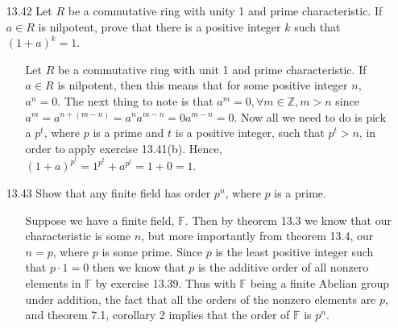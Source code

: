 \documentclass[12pt]{article}
\begin{document}
\begin{enumerate}
\item[13.42] Let $R$ be a commutative ring with unity 1 and prime characteristic. If $a \in R$ is nilpotent,
prove that there is a positive integer $k$ such that $(1 + a)^k = 1$.
\begin{enumerate}
\item[] Let $R$ be a commutative ring with unit 1 and prime characteristic. If $a \in R$ is nilpotent, then
this means that for some positive integer $n$, $a^n = 0$. The next thing to note is that 
$a^m = 0, \forall m \in \mathbb{Z}, m > n$ since $a^m = a^{n + (m - n)} = a^na^{m - n} = 0a^{m - n} = 0$. 
Now all we need to do is pick a $p^t$, where $p$ is a prime and $t$ is a positive integer, such that
$p^t > n$, in order to apply exercise 13.41(b). Hence, $(1 + a)^{p^t} = 1^{p^t} + a^{p^t} = 1 + 0 = 1$.
\end{enumerate}

\item[13.43] Show that any finite field has order $p^n$, where $p$ is a prime. 
\begin{enumerate}
\item[] Suppose we have a finite field, $\mathbb{F}$. Then by theorem 13.3 we know that our characteristic is some $n$, 
but more importantly from theorem 13.4, our $n = p$, where $p$ is some prime. Since $p$ is the least positive integer 
such that $p \cdot 1 = 0$ then we know that $p$ is the additive order of all nonzero elements in $\mathbb{F}$
by exercise 13.39. Thus with $\mathbb{F}$ being a finite Abelian group under addition, 
the fact that all the orders of the nonzero elements are $p$, and theorem 7.1, corollary 2 implies that 
the order of $\mathbb{F}$ is $p^n$.
\end{enumerate}


\end{enumerate}
\end{document}
